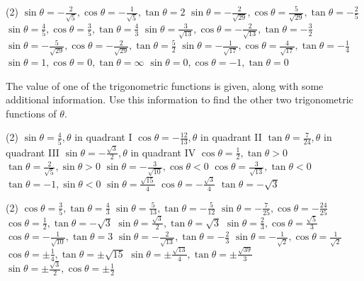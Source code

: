 \documentclass[12pt,fleqn]{book}
\newcommand{\prb}[1]{\begin{Exercise}\parbox[t]{\textwidth-5em}{#1}\end{Exercise}}
\newcommand{\sol}[1]{\begin{Answer}\parbox[t]{\textwidth-5em}{#1}\end{Answer}}
\begin{document}
\sol{
	\begin{tasks}(2)
		\task $\sin \theta=-\frac{2}{\sqrt{5}}, \cos \theta=-\frac{1}{\sqrt{5}}, \tan \theta=2$
		\task $\sin \theta=-\frac{2}{\sqrt{29}}, \cos \theta=\frac{5}{\sqrt{29}}, \tan \theta=-\frac{2}{5}$
		\task $\sin \theta=\frac{4}{5}, \cos \theta=\frac{3}{5}, \tan \theta=\frac{4}{3}$
		\task $\sin \theta=\frac{3}{\sqrt{13}}, \cos \theta=-\frac{2}{\sqrt{13}}, \tan \theta=-\frac{3}{2}$
		\task $\sin \theta=-\frac{5}{\sqrt{29}}, \cos \theta=-\frac{2}{\sqrt{29}}, \tan \theta=\frac{5}{2}$
		\task $\sin \theta=-\frac{1}{\sqrt{17}}, \cos \theta=\frac{4}{\sqrt{17}}, \tan \theta=-\frac{1}{4}$
		\task $\sin \theta=1, \cos \theta=0, \tan \theta=\infty$
		\task $\sin \theta=0, \cos \theta=-1, \tan \theta=0$
	\end{tasks}
}
\prb{
	The value of one of the trigonometric functions is given, along with some additional information. Use this information to find the other two trigonometric functions of $\theta$.
	\begin{tasks}(2)
		\task $\sin \theta=\frac{4}{5}, \theta$ in quadrant $\mathrm{I}$
		\vspace{8.5em}
		\task $\cos \theta=-\frac{12}{13}, \theta$ in quadrant II
		\vspace{8.5em}
		\task $\tan \theta=\frac{7}{24}, \theta$ in quadrant III
		\vspace{8.5em}
		\task $\sin \theta=-\frac{\sqrt{3}}{2}, \theta$ in quadrant IV
		\vspace{8.5em}
		\task $\cos \theta=\frac{1}{2}, \tan \theta>0$
		\vspace{8.5em}
		\task $\tan \theta=\frac{2}{\sqrt{5}}, \sin \theta>0$
		\vspace{8.5em}
		\task $\sin \theta=-\frac{3}{\sqrt{10}}, \cos \theta<0$
		\vspace{8.5em}
		\task $\cos \theta=\frac{3}{\sqrt{13}}, \tan \theta<0$
		\vspace{8.5em}
		\task $\tan \theta=-1, \sin \theta<0$
		\vspace{8.5em}
		\task $\sin \theta=\frac{\sqrt{15}}{4}$
		\vspace{8.5em}
		\task $\cos \theta=-\frac{\sqrt{3}}{4}$
		\vspace{8.5em}
		\task $\tan \theta=-\sqrt{3}$
		\vspace{8.5em}
	\end{tasks}
}
\sol{
	\begin{tasks}(2)
		\task $\cos \theta=\frac{3}{5}, \tan \theta=\frac{4}{3}$
		\task $\sin \theta=\frac{5}{13}, \tan \theta=-\frac{5}{12}$
		\task $\sin \theta=-\frac{7}{25}, \cos \theta=-\frac{24}{25}$
		\task $\cos \theta=\frac{1}{2}, \tan \theta=-\sqrt{3}$
		\task $\sin \theta=\frac{\sqrt{3}}{2}, \tan \theta=\sqrt{3}$
		\task $\sin \theta=\frac{2}{3}, \cos \theta=\frac{\sqrt{5}}{3}$
		\task $\cos \theta=-\frac{1}{\sqrt{10}}, \tan \theta=3$
		\task $\sin \theta=-\frac{2}{\sqrt{13}}, \tan \theta=-\frac{2}{3}$
		\task $\sin \theta=-\frac{1}{\sqrt{2}}, \cos \theta=\frac{1}{\sqrt{2}}$
		\task $\cos \theta=\pm \frac{1}{4}, \tan \theta=\pm \sqrt{15}$
		\task $\sin \theta=\pm \frac{\sqrt{13}}{4}, \tan \theta=\pm \frac{\sqrt{39}}{3}$
		\task $\sin \theta=\pm \frac{\sqrt{3}}{2}, \cos \theta=\pm \frac{1}{2}$
	\end{tasks}
}
\end{document}

